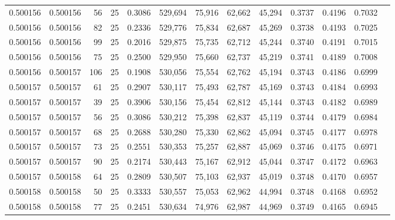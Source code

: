 \begin{tabular}{rrrrrrrrrrrrr}
0.500156 & 0.500156 &    56 &  25 &                                     0.3086 & 529,694 &  75,916 &  62,662 &  45,294 & 0.3737 & 0.4196 & 0.7032 \\
0.500156 & 0.500156 &    82 &  25 &                                     0.2336 & 529,776 &  75,834 &  62,687 &  45,269 & 0.3738 & 0.4193 & 0.7025 \\
0.500156 & 0.500156 &    99 &  25 &                                     0.2016 & 529,875 &  75,735 &  62,712 &  45,244 & 0.3740 & 0.4191 & 0.7015 \\
0.500156 & 0.500156 &    75 &  25 &                                     0.2500 & 529,950 &  75,660 &  62,737 &  45,219 & 0.3741 & 0.4189 & 0.7008 \\
0.500156 & 0.500157 &   106 &  25 &                                     0.1908 & 530,056 &  75,554 &  62,762 &  45,194 & 0.3743 & 0.4186 & 0.6999 \\
0.500157 & 0.500157 &    61 &  25 &                                     0.2907 & 530,117 &  75,493 &  62,787 &  45,169 & 0.3743 & 0.4184 & 0.6993 \\
0.500157 & 0.500157 &    39 &  25 &                                     0.3906 & 530,156 &  75,454 &  62,812 &  45,144 & 0.3743 & 0.4182 & 0.6989 \\
0.500157 & 0.500157 &    56 &  25 &                                     0.3086 & 530,212 &  75,398 &  62,837 &  45,119 & 0.3744 & 0.4179 & 0.6984 \\
0.500157 & 0.500157 &    68 &  25 &                                     0.2688 & 530,280 &  75,330 &  62,862 &  45,094 & 0.3745 & 0.4177 & 0.6978 \\
0.500157 & 0.500157 &    73 &  25 &                                     0.2551 & 530,353 &  75,257 &  62,887 &  45,069 & 0.3746 & 0.4175 & 0.6971 \\
0.500157 & 0.500157 &    90 &  25 &                                     0.2174 & 530,443 &  75,167 &  62,912 &  45,044 & 0.3747 & 0.4172 & 0.6963 \\
0.500157 & 0.500158 &    64 &  25 &                                     0.2809 & 530,507 &  75,103 &  62,937 &  45,019 & 0.3748 & 0.4170 & 0.6957 \\
0.500158 & 0.500158 &    50 &  25 &                                     0.3333 & 530,557 &  75,053 &  62,962 &  44,994 & 0.3748 & 0.4168 & 0.6952 \\
0.500158 & 0.500158 &    77 &  25 &                                     0.2451 & 530,634 &  74,976 &  62,987 &  44,969 & 0.3749 & 0.4165 & 0.6945 \\

\end{tabular}
